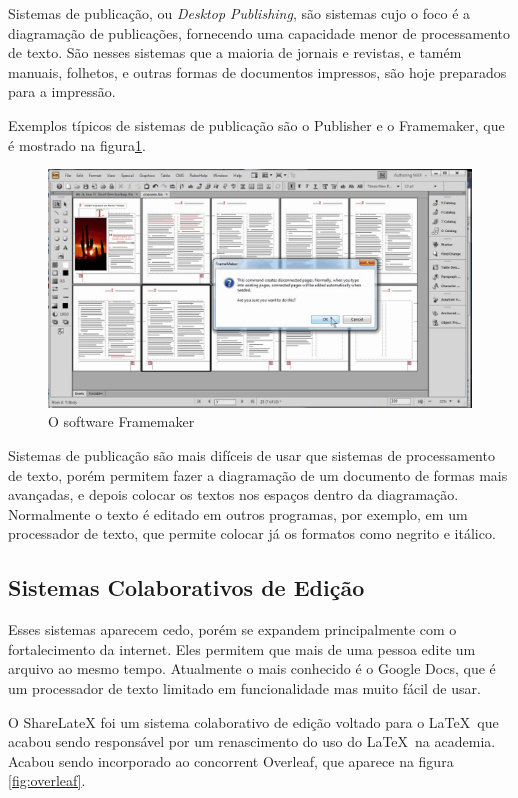 Sistemas de publicação, ou \textit{Desktop Publishing}, são sistemas cujo o foco é a diagramação de publicações, fornecendo uma capacidade menor de processamento de texto. São nesses sistemas que a maioria de jornais e revistas, e tamém manuais, folhetos, e outras formas de documentos impressos, são hoje preparados para a impressão.

Exemplos típicos de sistemas de publicação são o Publisher e o Framemaker, que é mostrado na figura\ref{fig:framemaker}.

\begin{figure}[hbt]
    \centering
    \includegraphics[width=0.7\linewidth]{Images/framemaker}
    \caption[O software Framemaker]{O software Framemaker}
    \label{fig:framemaker}
\end{figure}

Sistemas de publicação são mais difíceis de usar que sistemas de processamento de texto, porém permitem fazer a diagramação de um documento de formas mais avançadas, e depois colocar os textos nos espaços dentro da diagramação. Normalmente o texto é editado em outros programas, por exemplo, em um processador de texto, que permite colocar já os formatos como negrito e itálico.


\subsection{Sistemas Colaborativos de Edição}

Esses sistemas aparecem cedo, porém se expandem principalmente com o fortalecimento da internet. Eles permitem que mais de uma pessoa edite um arquivo ao mesmo tempo. Atualmente o mais conhecido é o Google Docs, que é um processador de texto limitado em funcionalidade mas muito fácil de usar.

O ShareLateX foi um sistema colaborativo de edição voltado para o \LaTeX\ que acabou sendo responsável por um renascimento do uso do \LaTeX\  na academia. Acabou sendo incorporado ao concorrent Overleaf, que aparece na figura \ref{fig:overleaf}.

